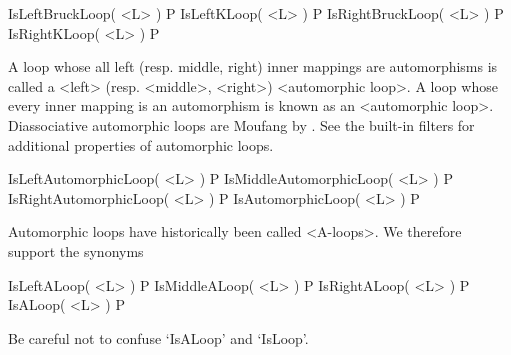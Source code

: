 \>IsLeftBruckLoop( <L> ) P
\>IsLeftKLoop( <L> ) P
\>IsRightBruckLoop( <L> ) P
\>IsRightKLoop( <L> ) P

A loop whose all left (resp. middle, right) inner mappings are automorphisms is
called a <left> (resp. <middle>, <right>)
<automorphic loop>. A loop
whose every inner mapping is an automorphism is known as an
<automorphic loop>. Diassociative automorphic loops are Moufang by
\cite{KiKuPh}. See the built-in filters for additional properties of automorphic loops.

\>IsLeftAutomorphicLoop( <L> ) P
\>IsMiddleAutomorphicLoop( <L> ) P
\>IsRightAutomorphicLoop( <L> ) P
\>IsAutomorphicLoop( <L> ) P

Automorphic loops have historically been called <A-loops>. We therefore support the synonyms

\>IsLeftALoop( <L> ) P
\>IsMiddleALoop( <L> ) P
\>IsRightALoop( <L> ) P
\>IsALoop( <L> ) P

Be careful not to confuse `IsALoop' and `IsLoop'. 